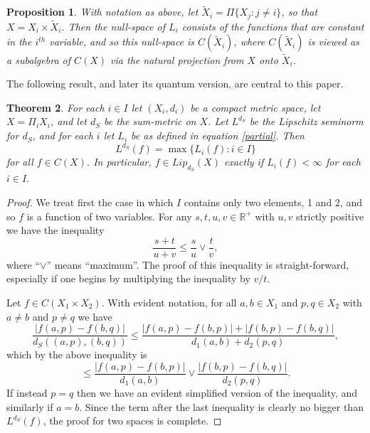 \documentclass{amsart}[14pt]
\newtheorem{theorem}{Theorem}[section]
\newtheorem{proposition}[theorem]{Proposition}
\theoremstyle{definition}
\theoremstyle{remark}
\newcommand{\bR}{{\mathbb R}}
\newcommand{\<}{\langle}
\renewcommand{\>}{\rangle}
\numberwithin{equation}{section}
\begin{document}
{\begin{proposition}
\label{nullj}
With notation as above, let $\tilde X_i = \Pi \{X_j: j \neq i\}$, 
so that $X = X_i \times \tilde X_i$. 
Then the null-space of $L_i$ 
consists of the functions that are constant
in the $i^{th}$ variable, and so this null-space is $C(\tilde X_i)$,
where  $C(\tilde X_i)$ is
viewed as a subalgebra of $C(X)$ via the natural projection
from $X$ onto $\tilde X_i$.
\end{proposition}

The following result, and later its quantum version, 
are central to this paper.

\begin{theorem}
\label{summet}
For each $i \in I$ let $(X_i, d_i)$ be a compact
metric space, let  $X = \Pi_i X_i$, and let $d_S$
be the sum-metric on $X$.  Let $L^{d_S}$ be the
Lipschitz seminorm for $d_S$, and for each $i$
let $L_i$ be as defined in equation \eqref{partial}. Then
\[
L^{d_S}(f) = \max\{ L_i(f): i \in I\}
\]
for all $f \in C(X)$. In particular, $f \in Lip_{d_S}(X)$ exactly if
$L_i(f) < \infty$ for each $i \in I$.
\end{theorem}

\begin{proof}
We treat first the case in which $I$ contains only two elements, 1 and 2,
and so $f$ is a function of two variables. 
For any  $s, t, u, v \in \bR^+$ with $u, v$ strictly positive we have
the inequality
\[
\frac{s+t }{u+v} \leq \frac{s}{u} \vee \frac{t}{v}   ,
\]
where ``$\vee$'' means ``maximum''.
The proof of this inequality is straight-forward, especially if one begins by
multiplying the inequality by $v/t$.

Let $f \in C(X_1 \times X_2)$.
With evident notation,
for all $a,b \in X_1$ and $p,q \in X_2$ with $a \neq b$ and $p \neq q$ we have
\[
\frac{|f(a,p) - f(b, q)|}{d_S((a,p), (b,q))} \leq
\frac{|f(a,p) - f(b,p)|+|f(b,p)- f(b,q)|}{d_1(a,b) + d_2(p,q)},
\]
which by the above inequality is
\[
\leq \frac{|f(a,p) - f(b,p)|}{d_1(a,b)} \vee \frac{|f(b,p)- f(b,q)|}{d_2(p,q)} .
\]
If instead $p=q$ then we have an evident simplified version of the inequality,
and similarly if $a = b$. 
Since the term after the last inequality is clearly no bigger than
$L^{d_S}(f)$, the proof for two spaces is complete.


\end{proof}}
\end{document}
